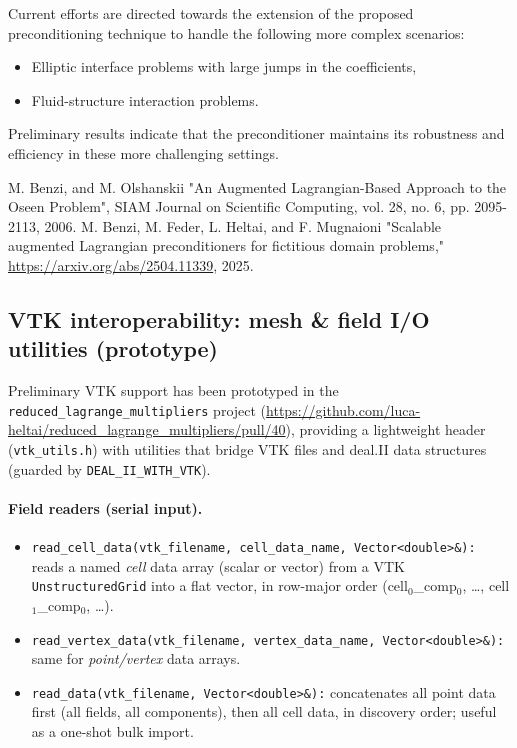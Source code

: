 \documentclass[a4paper,12pt]{article}
\begin{document}
Current efforts are directed towards the extension of the proposed preconditioning technique
to handle the following more complex scenarios:
\begin{itemize}
    \item Elliptic interface problems with large jumps in the coefficients,
    \item Fluid-structure interaction problems.
\end{itemize}
Preliminary results indicate that the preconditioner maintains its robustness and efficiency in these more
challenging settings.

\begin{thebibliography}{10}
     M. Benzi, and M. Olshanskii "An Augmented Lagrangian-Based Approach to the Oseen Problem", SIAM Journal on Scientific
Computing, vol. 28, no. 6, pp. 2095-2113, 2006.
     M. Benzi, M. Feder, L. Heltai, and F. Mugnaioni "Scalable augmented Lagrangian preconditioners for fictitious domain problems," \url{https://arxiv.org/abs/2504.11339}, 2025.
\end{thebibliography}


\subsection{VTK interoperability: mesh \& field I/O utilities (prototype)}
Preliminary VTK support has been prototyped in the \texttt{reduced\_lagrange\_multipliers}
project (\url{https://github.com/luca-heltai/reduced_lagrange_multipliers/pull/40}),
providing a lightweight header (\texttt{vtk\_utils.h}) with utilities that bridge
VTK files and deal.II data structures (guarded by \texttt{DEAL\_II\_WITH\_VTK}).

\paragraph{Field readers (serial input).}
\begin{itemize}
  \item \texttt{read\_cell\_data(vtk\_filename, cell\_data\_name, Vector<double>\&):}
        reads a named \emph{cell} data array (scalar or vector) from a VTK
        \texttt{UnstructuredGrid} into a flat vector, in row-major order
        (cell\(_0\)\_comp\(_0\), \dots, cell\(_1\)\_comp\(_0\), \dots).
  \item \texttt{read\_vertex\_data(vtk\_filename, vertex\_data\_name, Vector<double>\&):}
        same for \emph{point/vertex} data arrays.
  \item \texttt{read\_data(vtk\_filename, Vector<double>\&):}
        concatenates all point data first (all fields, all components), then
        all cell data, in discovery order; useful as a one-shot bulk import.
\end{itemize}
\end{document}
